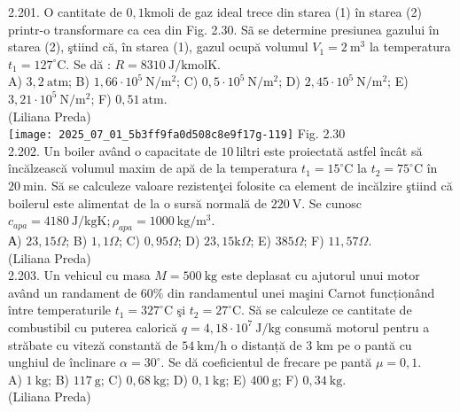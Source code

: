 2.201. O cantitate de $0,1 \mathrm{kmoli}$ de gaz ideal trece din starea (1) în starea (2) printr-o transformare ca cea din Fig. 2.30. Sã se determine presiunea gazului în starea (2), ştiind că, în starea (1), gazul ocupă volumul $V_{1}=2 \mathrm{~m}^{3}$ la temperatura ${t}_{1}=127^{\circ} \mathrm{C}$. Se dă : $R=8310 \mathrm{~J} / \mathrm{kmolK}$.\\ A) $3,2 \mathrm{~atm}$; B) $1,66 \cdot 10^{5} \mathrm{~N} / \mathrm{m}^{2}$; C) $0,5 \cdot 10^{5} \mathrm{~N} / \mathrm{m}^{2}$; D) $2,45 \cdot 10^{5} \mathrm{~N} / \mathrm{m}^{2}$; E) $3,21 \cdot 10^{5} \mathrm{~N} / \mathrm{m}^{2}$; F) $0,51 \mathrm{~atm}$.\\ (Liliana Preda)\\ \texttt{[image: 2025\_07\_01\_5b3ff9fa0d508c8e9f17g-119]} Fig. 2.30\\

2.202. Un boiler având o capacitate de $10 \mathrm{~liltri}$ este proiectată astfel încât să încălzească volumul maxim de apă de la temperatura $t_{1}=15^{\circ} \mathrm{C}$ la $t_{2}=75^{\circ} \mathrm{C}$ în $20 \mathrm{~min}$. Să se calculeze valoare rezistenţei folosite ca element de incălzire ştiind că boilerul este alimentat de la o sursă normală de $220 \mathrm{~V}$. Se cunosc $c_{a p a}=4180 \mathrm{~J} / \mathrm{kgK} ; \rho_{a p a}=1000 \mathrm{~kg} / \mathrm{m}^{3}$.\\ А) $23,15 \Omega$; B) $1,1 \Omega$; C) $0,95 \Omega$; D) $23,15 \mathrm{k} \Omega$; E) $385 \Omega$; F) $11,57 \Omega$.\\ (Liliana Preda)\\

2.203. Un vehicul cu masa $M=500 \mathrm{~kg}$ este deplasat cu ajutorul unui motor având un randament de $60 \%$ din randamentul unei maşini Carnot funcționând între temperaturile $t_{1}=327^{\circ} \mathrm{C}$ şi $t_{2}=27^{\circ} \mathrm{C}$. Să se calculeze ce cantitate de combustibil cu puterea calorică $q=4,18 \cdot 10^{7} \mathrm{~J} / \mathrm{kg}$ consumă motorul pentru a străbate cu viteză constantă de $54 \mathrm{~km} / \mathrm{h}$ o distanță de 3 km pe o pantă cu unghiul de înclinare $\alpha=30^{\circ}$. Se dă coeficientul de frecare pe pantă $\mu=0,1$.\\ A) $1 \mathrm{~kg}$; B) $117 \mathrm{~g}$; C) $0,68 \mathrm{~kg}$; D) $0,1 \mathrm{~kg}$; E) $400 \mathrm{~g}$; F) $0,34 \mathrm{~kg}$.\\ (Liliana Preda)\\

